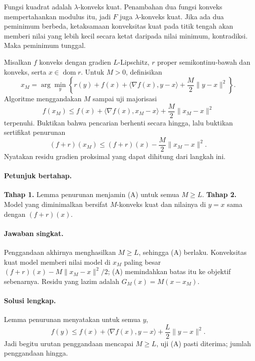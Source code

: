 Fungsi kuadrat adalah $\lambda$-konveks kuat. Penambahan dua fungsi konveks
mempertahankan modulus itu, jadi $F$ juga $\lambda$-konveks kuat. Jika ada dua
peminimum berbeda, ketaksamaan konveksitas kuat pada titik tengah akan memberi
nilai yang lebih kecil secara ketat daripada nilai minimum, kontradiksi. Maka
peminimum tunggal.

\begin{exercise}
\label{orig03:final:exercise:0002}
Misalkan $f$ konveks dengan gradien $L$-Lipschitz, $r$ proper
semikontinu-bawah dan konveks, serta $x\in\operatorname{dom}r$. Untuk $M>0$,
definisikan
\[
 x_M=\arg\min_y\left\{
 r(y)+f(x)+\langle\nabla f(x),y-x\rangle
 +\frac M2\lVert y-x\rVert^2\right\}.
\]
Algoritme menggandakan $M$ sampai uji majorisasi
\[
 f(x_M)\le f(x)+\langle\nabla f(x),x_M-x\rangle
 +\frac M2\lVert x_M-x\rVert^2                         \tag{A}
\]
terpenuhi. Buktikan bahwa pencarian berhenti secara hingga, lalu buktikan
sertifikat penurunan
\[
 (f+r)(x_M)\le(f+r)(x)-\frac M2\lVert x_M-x\rVert^2.
\]
Nyatakan residu gradien proksimal yang dapat dihitung dari langkah ini.
\end{exercise}

\paragraph{Petunjuk bertahap.}
\label{orig03:final:hint:0002}
\textbf{Tahap 1.} Lemma penurunan menjamin (A) untuk semua $M\ge L$.
\textbf{Tahap 2.} Model yang diminimalkan bersifat $M$-konveks kuat dan
nilainya di $y=x$ sama dengan $(f+r)(x)$.

\paragraph{Jawaban singkat.}
\label{orig03:final:answer:0002}
Penggandaan akhirnya menghasilkan $M\ge L$, sehingga (A) berlaku. Konveksitas
kuat model memberi nilai model di $x_M$ paling besar
$(f+r)(x)-M\lVert x_M-x\rVert^2/2$; (A) memindahkan batas itu ke objektif
sebenarnya. Residu yang lazim adalah
$G_M(x)=M(x-x_M)$.

\paragraph{Solusi lengkap.}
\label{orig03:final:solution:0002}
Lemma penurunan menyatakan untuk semua $y$,
\[
 f(y)\le f(x)+\langle\nabla f(x),y-x\rangle
 +\frac L2\lVert y-x\rVert^2.
\]
Jadi begitu urutan penggandaan mencapai $M\ge L$, uji (A) pasti diterima;
jumlah penggandaan hingga.

